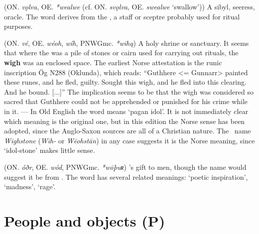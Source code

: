 \begin{itemize}
 (ON. \emph{vǫlva}, OE. \emph{*wealwe} (cf. ON. \emph{svǫlva}, OE. \emph{swealwe} ‘swallow’))
  A sibyl, seeress, oracle. The word derives from the , a staff or sceptre probably used for ritual purposes.

 (ON. \emph{vé}, OE. \emph{wéoh}, \emph{wíh}, PNWGmc. \emph{*wīhą})
  A holy shrine or sanctuary. It seems that where the  was a pile of stones or cairn used for carrying out rituals, the \textbf{wigh} was an enclosed space. The earliest Norse attestation is the runic inscription Ög N288 (Oklunda), which reads: “Guthhere <= Gunnarr> painted these runes, and he fled, guilty. Sought this wigh, and he fled into this clearing. And he bound. [...]” The implication seems to be that the wigh was considered so sacred that Guthhere could not be apprehended or punished for his crime while in it. — In Old English the word means ‘pagan idol’. It is not immediately clear which meaning is the original one, but in this edition the Norse sense has been adopted, since the Anglo-Saxon sources are all of a Christian nature. The \Beowulf\ name \emph{Wighstone} (\emph{Wīh-} or \emph{Wēohstān}) in any case suggests it is the Norse meaning, since ‘idol-stone’ makes little sense.

 (ON. \emph{óðr}, OE. \emph{wód}, PNWGmc. \emph{*wōþuʀ})
  's gift to men, though the name would suggest it be from . The word has several related meanings: ‘poetic inspiration’, ‘madness’, ‘rage’.

\end{itemize}


\section{People and objects (P)}

